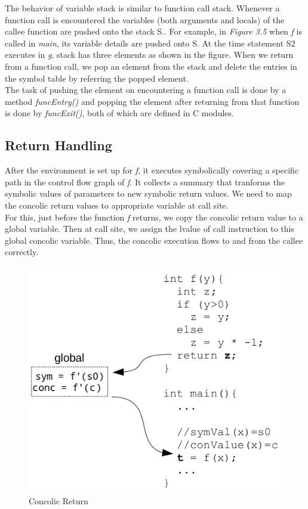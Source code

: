 \documentclass[12pt,oneside]{book}
\begin{document}
The behavior of variable stack is similar to function call stack. Whenever a function call is encountered the variables (both arguments and locals) of the callee function are pushed onto the stack S.. For example, in \textit{Figure 3.5} when \textit{f} is called in \textit{main}, its variable details are pushed onto S. At the time statement S2 executes in \textit{g}, stack has three elements as shown in the figure.
When we return from a function call, we pop an element from the stack and delete the entries in the symbol table by referring the popped element.\\
The task of pushing the element on encountering a function call is done by a method \textit{funcEntry()} and popping the element after returning from that function is done by \textit{funcExit()}, both of which are defined in C modules.

\subsection{Return Handling}
After the environment is set up for \textit{f}, it executes symbolically covering a specific path in the control flow graph of \textit{f}. It collects a summary that tranforms the symbolic values of parameters to new symbolic return values. We need to map the concolic return values to appropriate variable at call site.\\ 
For this, just before the function \textit{f} returns, we copy the concolic return value to a global variable. Then at call site, we assign the lvalue of call instruction to this global concolic variable. Thus, the concolic execution flows to and from the callee correctly.   

\vspace{0.3cm}
\begin{figure}[htbp]
\centering
\includegraphics[scale=0.40]{return.png}
\caption{Concolic Return}
\end{figure}
\end{document}
